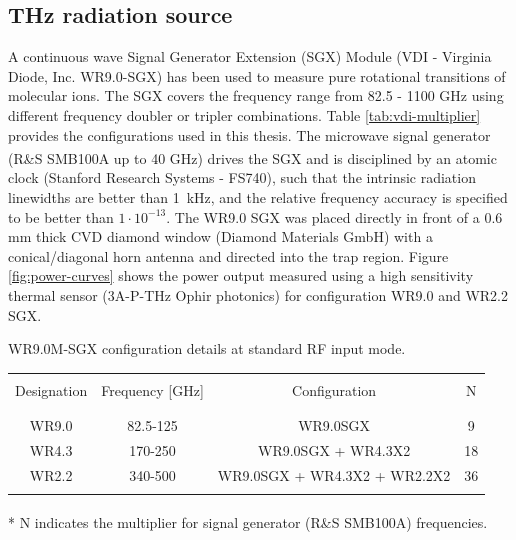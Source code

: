 \subsection{THz radiation source}
\label{subsec:rot:radiation-source}

A continuous wave Signal Generator Extension (SGX) Module (VDI - Virginia Diode, Inc. WR9.0-SGX) has been used to measure pure rotational transitions of molecular ions. The SGX covers the frequency range from 82.5 - 1100 GHz using different frequency doubler or tripler combinations. Table \ref{tab:vdi-multiplier} provides the configurations used in this thesis. The microwave signal generator (R\&S \textsuperscript{\textregistered} SMB100A up to 40 GHz) drives the SGX and is disciplined by an atomic clock (Stanford Research Systems - FS740), such that the intrinsic radiation linewidths are better than 1~kHz, and the relative frequency accuracy is specified to be better than $1\cdot 10^{-13}$. The WR9.0 SGX was placed directly in front of a 0.6 mm thick CVD diamond window (Diamond Materials GmbH) with a conical/diagonal horn antenna and directed into the trap region. Figure \ref{fig:power-curves} shows the power output measured using a high sensitivity thermal sensor (3A-P-THz Ophir photonics) for configuration WR9.0 and WR2.2 SGX.

\begin{threeparttable}[!htb]
    \centering
    \caption{WR9.0M-SGX configuration details at standard RF input mode. }
    \begin{tabular}{cccc}
        \hline\\
        Designation & Frequency [GHz] & Configuration & N\tnote{*} \\
        \\\hline\hline\\
        WR9.0 & 82.5-125 & WR9.0SGX & 9 \\
        WR4.3 & 170-250 & WR9.0SGX + WR4.3X2 & 18 \\
        WR2.2 & 340-500 & WR9.0SGX + WR4.3X2 + WR2.2X2 & 36 \\
        \\\hline\hline
    \end{tabular}
    \begin{tablenotes}
        \item[*] N indicates the multiplier for signal generator (R\&S \textsuperscript{\textregistered} SMB100A) frequencies.\\
    \end{tablenotes}
    \label{tab:vdi-multiplier}
\end{threeparttable}

